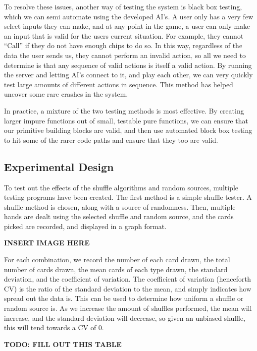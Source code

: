 To resolve these issues, another way of testing the system is black box
testing, which we can semi automate using the developed AI's. A user only
has a very few select inputs they can make, and at any point in the game,
a user can only make an input that is valid for the users current situation.
For example, they cannot ``Call'' if they do not have enough chips to do so.
In this way, regardless of the data the user sends us, they cannot perform
an invalid action, so all we need to determine is that any sequence of valid
actions is itself a valid action. By running the server and letting AI's
connect to it, and play each other, we can very quickly test large amounts
of different actions in sequence. This method has helped uncover some rare
crashes in the system.

In practice, a mixture of the two testing methods is most effective. By
creating larger impure functions out of small, testable pure functions, we
can ensure that our primitive building blocks are valid, and then use automated
block box testing to hit some of the rarer code paths and ensure that they
too are valid.

\subsection{Experimental Design}
To test out the effects of the shuffle algorithms and random sources, multiple
testing programs have been created. The first method is a simple shuffle
tester. A shuffle method is chosen, along with a source of randomness. Then,
multiple hands are dealt using the selected shuffle and random source, and
the cards picked are recorded, and displayed in a graph format.

\textbf{INSERT IMAGE HERE}

For each combination, we record the number of each card drawn, the total
number of cards drawn, the mean cards of each type drawn, the standard
deviation, and the coefficient of variation. The coefficient of variation
(henceforth CV) is the ratio of the standard deviation to the mean, and
simply indicates how spread out the data is. This can be used to determine
how uniform a shuffle or random source is. As we increase the amount of
shuffles performed, the mean will increase, and the standard deviation will
decrease, so given an unbiased shuffle, this will tend towards a CV of 0.

\textbf{TODO: FILL OUT THIS TABLE}

